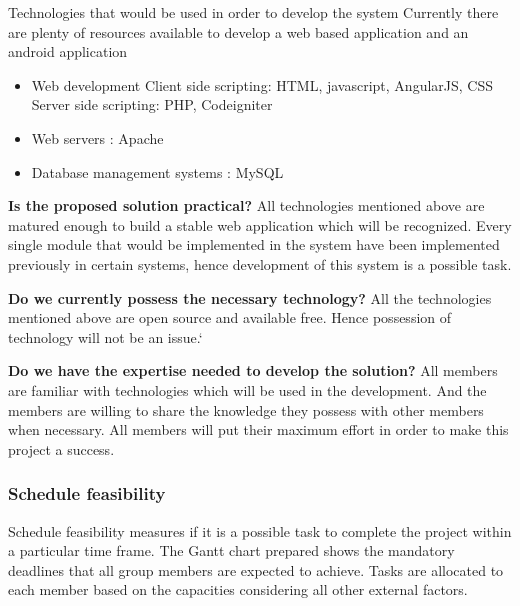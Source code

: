 \documentclass[a4paper,beamer]{article}
\begin{document}
	Technologies that would be used in order to develop the system
	Currently there are plenty of resources available to develop a web based application and an android application
	\begin{itemize}
		\item Web development
		Client side scripting: HTML, javascript, AngularJS, CSS
		Server side scripting: PHP, Codeigniter
		\item Web servers : Apache
		\item  Database management systems : MySQL
	\end{itemize}

	\noindent\textbf{Is the proposed solution practical?}\newline
	All technologies mentioned above are matured enough to build a stable web application which will be recognized. Every single module that would be implemented in the system have been implemented previously in certain systems, hence development of this system is a possible task.\newline
	
	\noindent\textbf{Do we currently possess the necessary technology?}\newline
	All the technologies mentioned above are open source and available free. Hence possession of technology will not be an issue.\newline`
	
	\noindent\textbf{Do we have the expertise needed to develop the solution?}\newline
	All members are familiar with technologies which will be used in the development. And the members are willing to share the knowledge they possess with other members when necessary. All members will put their maximum effort in order to make this project a success.\newline
	
	\subsubsection{Schedule feasibility}
	Schedule feasibility measures if it is a possible task to complete the project within a particular time frame.\newline
	The Gantt chart prepared shows the mandatory deadlines that all group members are expected to achieve. Tasks are allocated to each member based on the capacities considering all other external factors. \newline
\end{document}
